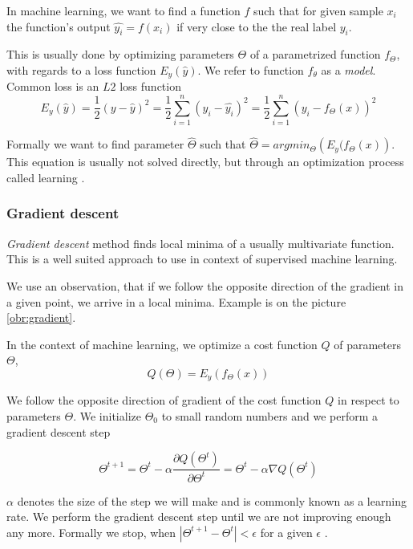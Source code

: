     \* %
    
    In machine learning, we want to find a function $f$ such that for given sample $x_i$
    the function's output $\hat{y_i} = f(x_i)$ if very close to the the real label $y_i$.
    
    This is usually done by optimizing parameters $\Theta$ of a parametrized function $f_\Theta$,
    with regards to a loss function $E_y(\hat{y})$. 
    We refer to function $f_\theta$ as a \textit{model}.
    Common loss is an $L2$ loss function 
    $$E_y(\hat{y}) = \frac{1}{2}(y - \hat{y})^2 = \frac{1}{2}\sum_{i=1}^n (y_i - \hat{y_i})^2= \frac{1}{2}\sum_{i=1}^n (y_i - f_\Theta(x))^2$$  
    
    Formally we want to find parameter $\hat{\Theta}$ such that $\hat{\Theta} = argmin_\Theta \left(E_y(f_\Theta(x) \right)$. 
    This equation is usually not solved directly, but through an optimization process called learning \cite{Goodfellow-et-al-2016}. %
    
    \subsubsection{Gradient descent}

    \textit{Gradient descent} method finds local minima of a usually multivariate function. 
    This is a well suited approach to use in context of supervised machine learning. 
    
    We use an observation, that if we follow the opposite direction of the gradient in a given point, 
    we arrive in a local minima. Example is on the picture \ref{obr:gradient}.
    
    In the context of machine learning, we optimize a cost function $Q$ of parameters $\Theta$, 
    $$Q(\Theta) = E_y(f_\Theta(x))$$
    
    We follow the opposite direction of gradient of the cost function $Q$ in respect to parameters $\Theta$. 
    We initialize $\Theta_0$ to small random numbers and we perform a gradient descent step
    
    $$\Theta^{t+1} = \Theta^t - \alpha \frac{\partial Q(\Theta^t)}{\partial \Theta^t} = \Theta^t - \alpha \nabla Q(\Theta^t)$$
    
    $\alpha$ denotes the size of the step we will make and is commonly known as a learning rate. 
    We perform the gradient descent step until we are not improving enough any more. 
    Formally we stop, when $|\Theta^{t+1} - \Theta^t| < \epsilon$ for a given $\epsilon$ \cite{bottou-bousquet-2008}.
    
